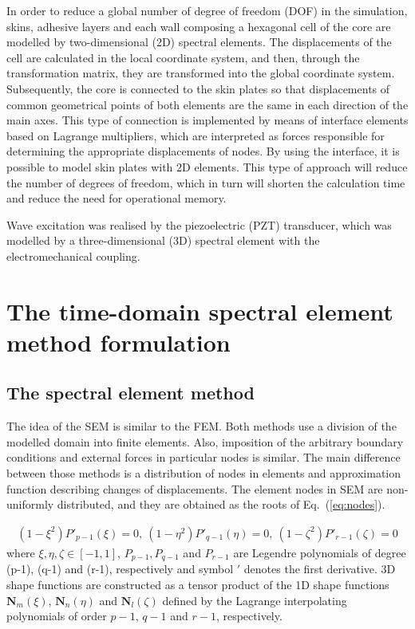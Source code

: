 \documentclass[a4paper,12pt]{article}
\begin{document}
In order to reduce a global number of degree of freedom (DOF) in the 
simulation, skins, adhesive layers and each wall composing a hexagonal cell of 
the core are modelled by two-dimensional (2D) spectral elements.
The displacements of the cell are calculated in the local coordinate system, 
and then, through the transformation matrix, they are transformed into the 
global coordinate system. Subsequently, the core is connected to the skin 
plates so that displacements of common geometrical points of both elements are 
the same in each direction of the main axes.
This type of connection is implemented by means of interface elements based on 
Lagrange multipliers, which are interpreted as forces responsible for 
determining the appropriate displacements of nodes.
By using the interface, it is possible to model skin plates with 2D elements.
This type of approach will reduce the number of degrees of freedom, which in 
turn will shorten the calculation time and reduce the need for operational 
memory.

Wave excitation was realised by the piezoelectric (PZT) transducer, which was 
modelled by a three-dimensional (3D) spectral element with the 
electromechanical coupling.
\section{The time-domain spectral element method formulation}
\label{sec:time_SEM}
\subsection{The spectral element method}
\label{sec:sem}
The idea of the SEM is similar to the FEM.
Both methods use a division of the modelled domain into finite elements.
Also, imposition of the arbitrary boundary conditions and external forces in 
particular nodes is similar.
The main difference between those methods is a distribution of nodes in 
elements and approximation function describing changes of displacements.
The element nodes in SEM are non-uniformly distributed, and they are obtained 
as the roots of Eq.~(\ref{eq:nodes}).

\begin{eqnarray}
(1-\xi^2)P'_{p-1}(\xi)=0,\ (1-\eta^2)P'_{q-1}(\eta)=0,\ (1-\zeta^2)P'_{r-1}(\zeta)=0
	\label{eq:nodes}
\end{eqnarray} 
where $\xi,\eta,\zeta\in[-1,1]$, $P_{p-1},P_{q-1}$ and $P_{r-1}$ are Legendre polynomials of degree (p-1), (q-1) and (r-1), respectively and symbol $'$ denotes the first derivative. 3D shape functions are constructed as a tensor product of the 1D shape functions $\textbf{N}_m(\xi)$, $\textbf{N}_n(\eta)$ and $\textbf{N}_l(\zeta)$ defined by the Lagrange interpolating polynomials of order $p-1$, $q-1$ and $r-1$, respectively.
\end{document}
